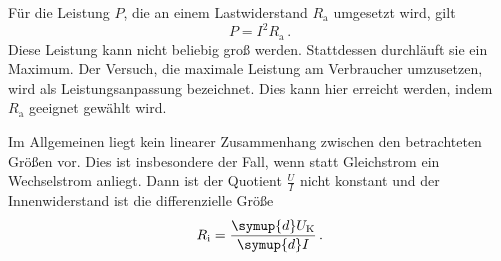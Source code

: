Für die Leistung $P$, die an einem Lastwiderstand $R_\text{a}$ umgesetzt wird,
gilt
\begin{equation}
  P = I^2 R_\text{a}\,.
  \label{eqn:leistung}
\end{equation}
Diese Leistung kann nicht beliebig groß werden. Stattdessen durchläuft sie ein
Maximum. Der Versuch, die maximale Leistung am Verbraucher umzusetzen, wird als
Leistungsanpassung bezeichnet. Dies kann hier erreicht werden, indem $R_\text{a}$
geeignet gewählt wird.

Im Allgemeinen liegt kein linearer Zusammenhang zwischen den betrachteten Größen vor.
Dies ist insbesondere der Fall, wenn statt Gleichstrom ein Wechselstrom anliegt.
Dann ist der Quotient $\frac{U}{I}$ nicht konstant und der Innenwiderstand ist
die differenzielle Größe
\begin{equation}
  R_\text{i} = \frac{\symup{d} U_\text{K}}{\symup{d} I}\,.
  \label{eqn:differentiell}
\end{equation}

